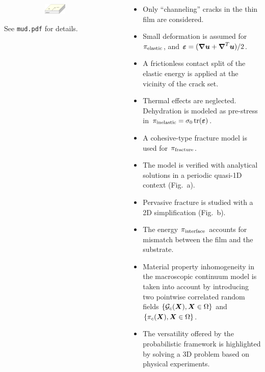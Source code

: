 \begin{frame}{}
\begin{columns}
\begin{column}{0.3\textwidth}
\begin{figure}[htb!]
            \begin{subfigure}[b]{\textwidth}
                \centering
                \includegraphics[width=0.6\textwidth]{past/figures/3D_schematic.png}
                \caption{}
            \end{subfigure}
        \end{figure}
        \vspace{-1em}
        \begin{exampleblock}{}
          See \texttt{mud.pdf} for details.
        \end{exampleblock}
    \end{column}
    \begin{column}{0.7\textwidth}
        \begin{itemize}
            \item Only ``channeling'' cracks in the thin film are considered.
            \item Small deformation is assumed for $\pi_{\text{elastic}}$, and $\boldsymbol{\varepsilon} = (\boldsymbol{\nabla} \boldsymbol{u} + \boldsymbol{\nabla}^T \boldsymbol{u})/2$.
            \item \textcolor<5>{dukeroyal}{A frictionless contact split of the elastic energy is applied at the vicinity of the crack set.}
            \item Thermal effects are neglected. Dehydration is modeled as pre-stress in $\pi_{\text{inelastic}} = \sigma_0 \operatorname{tr}(\boldsymbol{\varepsilon})$.
            \item A cohesive-type fracture model is used for $\pi_{\text{fracture}}$.
            \pause
            \item The model is verified with analytical solutions in a periodic quasi-1D context (Fig.~a).
            \pause
            \item Pervasive fracture is studied with a 2D simplification (Fig.~b).
            \item The energy $\pi_{\text{interface}}$ accounts for mismatch between the film and the substrate.
            \item \textcolor<5>{dukeroyal}{Material property inhomogeneity in the macroscopic continuum model is taken into account by introducing two pointwise correlated random fields $\{{\mathcal{G}_c}(\boldsymbol{X}), \boldsymbol{X} \in \Omega\}$ and $\{\pi_c(\boldsymbol{X}), \boldsymbol{X} \in \Omega\}$.}
            \pause
            \item \textcolor<5>{dukeroyal}{The versatility offered by the probabilistic framework is highlighted by solving a 3D problem based on physical experiments.}
        \end{itemize}
    \end{column}
\end{columns}
\end{frame}

